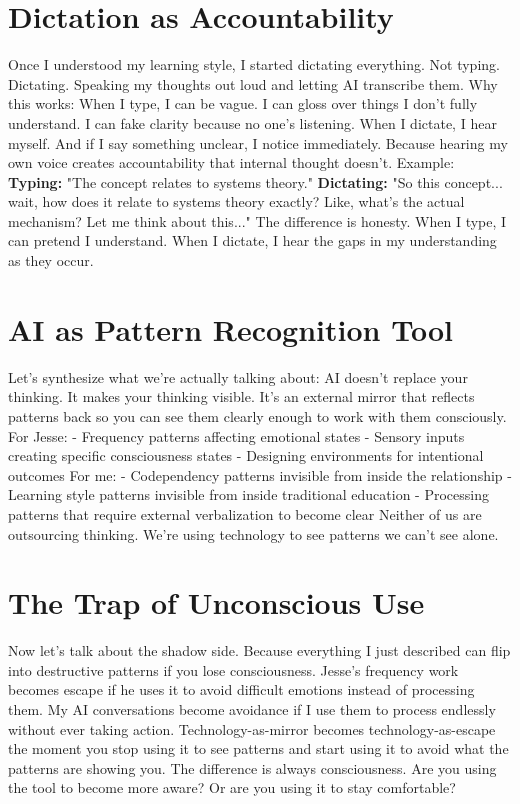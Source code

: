 \section{Dictation as Accountability}

Once I understood my learning style, I started dictating everything.
Not typing. Dictating. Speaking my thoughts out loud and letting AI transcribe them.
Why this works:
When I type, I can be vague. I can gloss over things I don't fully understand. I can fake clarity because no one's listening.
When I dictate, I hear myself.
And if I say something unclear, I notice immediately. Because hearing my own voice creates accountability that internal thought doesn't.
Example:
\textbf{Typing:} "The concept relates to systems theory."
\textbf{Dictating:} "So this concept... wait, how does it relate to systems theory exactly? Like, what's the actual mechanism? Let me think about this..."
The difference is honesty.
When I type, I can pretend I understand. When I dictate, I hear the gaps in my understanding as they occur.

\section{AI as Pattern Recognition Tool}

Let's synthesize what we're actually talking about:
AI doesn't replace your thinking. It makes your thinking visible.
It's an external mirror that reflects patterns back so you can see them clearly enough to work with them consciously.
For Jesse:
- Frequency patterns affecting emotional states
- Sensory inputs creating specific consciousness states
- Designing environments for intentional outcomes
For me:
- Codependency patterns invisible from inside the relationship
- Learning style patterns invisible from inside traditional education
- Processing patterns that require external verbalization to become clear
Neither of us are outsourcing thinking. We're using technology to see patterns we can't see alone.

\section{The Trap of Unconscious Use}

Now let's talk about the shadow side.
Because everything I just described can flip into destructive patterns if you lose consciousness.
Jesse's frequency work becomes escape if he uses it to avoid difficult emotions instead of processing them.
My AI conversations become avoidance if I use them to process endlessly without ever taking action.
Technology-as-mirror becomes technology-as-escape the moment you stop using it to see patterns and start using it to avoid what the patterns are showing you.
The difference is always consciousness.
Are you using the tool to become more aware? Or are you using it to stay comfortable?

